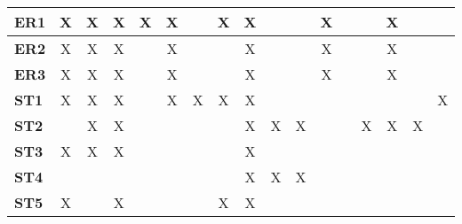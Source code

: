 \documentclass[12pt]{article}
\begin{document}
\begin{table}[H]
\begin{adjustwidth}{-0.1in}{-1in}
{\begin{tabular}{c|c|c|c|c|c|c|c|c|c|c|c|c|c|c|c|c|}
\multicolumn{1}{|l|}{\textbf{ER1}}   &      X       &      X       &       X      &      X       &       X      &              &       X      &       X      &              &              &      X       &              &              &      X       &              &               \\ \hline
\multicolumn{1}{|l|}{\textbf{ER2}}   &      X       &      X       &       X      &              &       X      &              &              &       X      &              &              &      X       &              &              &      X       &              &               \\ \hline
\multicolumn{1}{|l|}{\textbf{ER3}}   &      X       &      X       &       X      &              &       X      &              &              &       X      &              &              &      X       &              &              &      X       &              &               \\ \hline
\multicolumn{1}{|l|}{\textbf{ST1}}   &      X       &      X       &       X      &              &       X      &      X       &       X      &       X      &              &              &              &              &              &              &              &       X       \\ \hline
\multicolumn{1}{|l|}{\textbf{ST2}}   &              &      X       &       X      &              &              &              &              &       X      &       X      &       X      &              &              &      X       &      X       &      X       &               \\ \hline
\multicolumn{1}{|l|}{\textbf{ST3}}   &      X       &      X       &       X      &              &              &              &              &       X      &              &              &              &              &              &              &              &               \\ \hline
\multicolumn{1}{|l|}{\textbf{ST4}}   &              &              &              &              &              &              &              &       X      &       X      &       X      &              &              &              &              &              &               \\ \hline
\multicolumn{1}{|l|}{\textbf{ST5}}   &      X       &              &       X      &              &              &              &       X      &       X      &              &              &              &              &              &              &              &               \\ \hline

\end{tabular}}
\end{adjustwidth}
\end{table}
\end{document}
